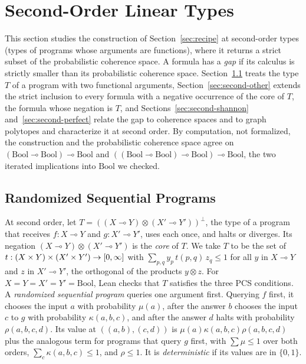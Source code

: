 \section{Second-Order Linear Types}
\label{sec:second}

This section studies the construction of Section~\ref{sec:recipe} at
second-order types (types of programs whose arguments are functions),
where it returns a strict subset of the probabilistic coherence space. A
formula has a \emph{gap} if its calculus is strictly smaller than its
probabilistic coherence space. Section~\ref{sec:second-seq} treats the
type $T$ of a program with two functional arguments,
Section~\ref{sec:second-other} extends the strict inclusion to every
formula with a negative occurrence of the core of $T$, the formula whose
negation is $T$, and Sections~\ref{sec:second-shannon}
and~\ref{sec:second-perfect} relate the gap to coherence spaces and to
graph polytopes and characterize it at second order. By computation, not formalized, the construction and the
probabilistic coherence space agree on $(\mathrm{Bool} \multimap
\mathrm{Bool}) \multimap \mathrm{Bool}$ and $((\mathrm{Bool} \multimap
\mathrm{Bool}) \multimap \mathrm{Bool}) \multimap \mathrm{Bool}$, the two
iterated implications into $\mathrm{Bool}$ we checked.

\subsection{Randomized Sequential Programs}
\label{sec:second-seq}

At second order, let
$T = ((X \multimap Y) \otimes (X' \multimap Y'))^{\perp}$, the type of a
program that receives $f : X \multimap Y$ and $g : X' \multimap Y'$,
uses each once, and halts or diverges. Its negation
$(X \multimap Y) \otimes (X' \multimap Y')$ is the \emph{core} of $T$. We
take $T$ to be the set of
$t : (X \times Y) \times (X' \times Y') \to [0,\infty]$ with
$\sum_{p,q} y_p\, t(p,q)\, z_q \le 1$ for all $y$ in $X \multimap Y$ and
$z$ in $X' \multimap Y'$, the orthogonal of the products $y \otimes z$.
For $X = Y = X' = Y' = \mathrm{Bool}$, Lean checks that $T$ satisfies
the three PCS conditions. A \emph{randomized sequential program} queries
one argument first. Querying $f$ first, it chooses the input $a$ with
probability $\mu(a)$, after the answer $b$ chooses the input $c$ to $g$
with probability $\kappa(a,b,c)$, and after the answer $d$ halts with
probability $\rho(a,b,c,d)$. Its value at $((a,b),(c,d))$ is
$\mu(a)\kappa(a,b,c)\rho(a,b,c,d)$ plus the analogous term for
programs that query $g$ first, with $\sum \mu \le 1$ over both orders,
$\sum_c \kappa(a,b,c) \le 1$, and $\rho \le 1$. It is
\emph{deterministic} if its values are in $\{0,1\}$.

